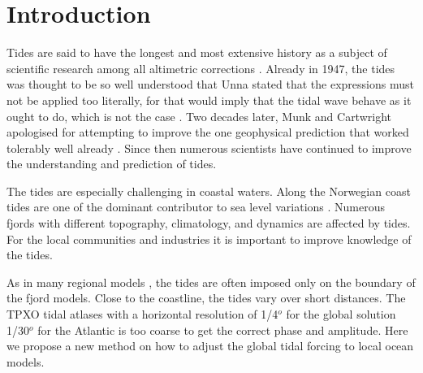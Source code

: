 \section{Introduction}

Tides are said to have the longest and most extensive history as a subject of scientific research among all altimetric corrections \cite[]{egbert94,cartwright77,hendershott81}. Already in 1947, the tides was thought to be so well understood that Unna stated that the expressions must not be applied too literally, for that would imply that the tidal wave behave as it ought to do, which is not the case \cite[]{unna47}. Two decades later, Munk and Cartwright apologised for attempting to improve the one geophysical prediction that worked tolerably well already \cite[]{munk66}. Since then numerous scientists have continued to improve the understanding and prediction of tides. 

The tides are especially challenging in coastal waters. Along the Norwegian coast tides are one of the dominant contributor to sea level variations \cite[]{grabbe09}. Numerous fjords with different topography, climatology, and dynamics are affected by tides. For the local communities and industries it is important to improve knowledge of the tides. 

As in many regional models \cite[]{gjevik89}, the tides are often imposed only on the boundary of the fjord models. Close to the coastline, the tides vary over short distances. The TPXO tidal atlases with a horizontal resolution of 1/4$^o$ for the global solution 1/30$^o$ for the Atlantic \cite[]{egbert94,egbert02} is too coarse to get the correct phase and amplitude. Here we propose a new method on how to adjust the global tidal forcing to local ocean models. 
